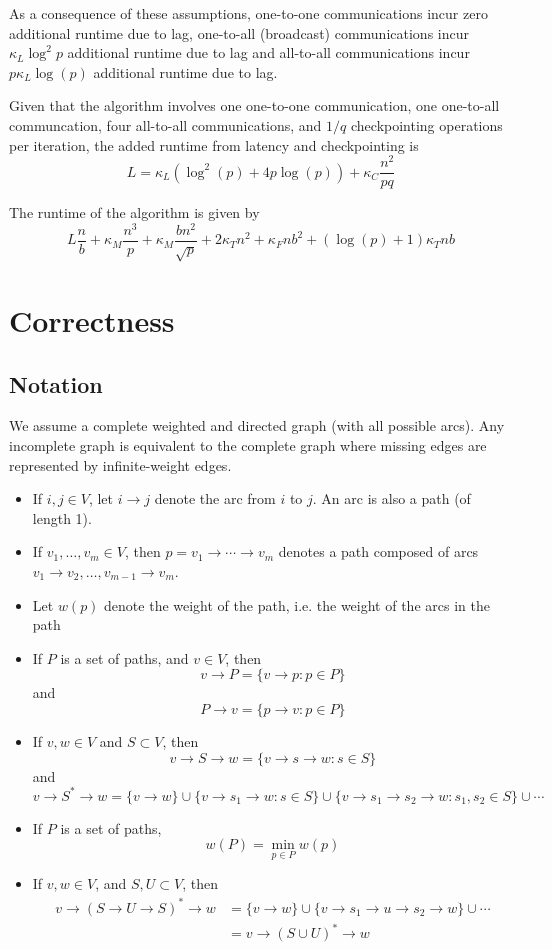 \documentclass{article} %
\begin{document}
As a consequence of these assumptions, one-to-one communications incur
zero additional runtime due to lag, one-to-all (broadcast)
communications incur $\kappa_L \log^2 p$ additional runtime due to
lag and all-to-all communications incur $p \kappa_L \log(p)$ additional
runtime due to lag.

Given that the algorithm involves one one-to-one communication, one
one-to-all communcation, four all-to-all communications, and $1/q$
checkpointing operations per iteration, the added runtime from latency
and checkpointing is
\[
L = \kappa_L(\log^2(p) + 4p\log(p)) + \kappa_C \frac{n^2}{pq}
\]

The runtime of the algorithm is given by
\[
L\frac{n}{b} + \kappa_M \frac{n^3}{p} + \kappa_M \frac{bn^2}{\sqrt{p}} + 2\kappa_T n^2 + \kappa_F nb^2 + (\log(p) + 1)\kappa_T nb
\]


\section{Correctness}

\subsection{Notation}

We assume a complete weighted and directed graph (with all possible
arcs).  Any incomplete graph is equivalent to the complete graph
where missing edges are represented by infinite-weight edges.

\begin{itemize}
\item If $i, j \in V$, let $i \to j$ denote the arc from $i$ to $j$.  An arc is also a path (of length 1).
\item If $v_1, \hdots, v_m \in V$, then $p = v_1\to \cdots \to v_m$  denotes a path composed of arcs $v_1 \to v_2, \hdots, v_{m-1} \to v_m$.
\item Let $w(p)$ denote the weight of the path, i.e. the weight of the arcs in the path
\item If $P$ is a set of paths, and $v \in V$, then
\[
v \to P = \{v \to p: p \in P\}
\]
and
\[
P \to v = \{p \to v: p \in P\}
\]
\item If $v, w \in V$ and $S \subset V$, then
\[ v \to S \to w = \{v \to s \to w: s \in S\}\]
and
\[
v \to S^* \to w = \{v \to w\} \cup \{v \to s_1 \to w: s \in S\} \cup \{v \to s_1 \to s_2 \to w: s_1, s_2 \in S\} \cup \cdots
\]
\item If $P$ is a set of paths,
\[
w(P) = \min_{p \in P} w(p)
\]
\item If $v, w \in V$, and $S, U \subset V$, then
\begin{align*}
v \to (S \to U \to S)^* \to w &= \{v \to w\} \cup \{v \to s_1 \to u \to s_2 \to w\} \cup \cdots\\
&= v \to (S \cup U)^* \to w
\end{align*}
\end{itemize}
\end{document}
